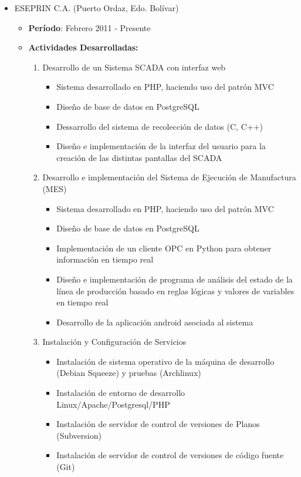 \documentclass[letterpaper,12pt]{report}
\begin{document}
    \begin{itemize}

        \item{ESEPRIN C.A. (Puerto Ordaz, Edo. Bolívar)}
        \begin{itemize}
        \item{\textbf{Período}: Febrero 2011 - Presente}
        \item{\textbf{Actividades Desarrolladas:}}
            \begin{enumerate}
            \item Desarrollo de un Sistema SCADA con interfaz web
                \begin{itemize}
                \item Sistema desarrollado en PHP, haciendo uso del patrón MVC
                \item Diseño de base de datos en PostgreSQL
                \item Dessarrollo del sistema de recolección de datos (C, C++)
                \item Diseño e implementación de la interfaz del usuario para la creación de las distintas pantallas del SCADA
                \end{itemize}
            \item Desarrollo e implementación del Sistema de Ejecución de Manufactura (MES)
                \begin{itemize}
                \item Sistema desarrollado en PHP, haciendo uso del patrón MVC
                \item Diseño de base de datos en PostgreSQL
                \item Implementación de un cliente OPC en Python para obtener información en tiempo real
                \item Diseño e implementación de programa de análisis del estado de la línea de producción basado en reglas lógicas y valores de variables en tiempo real
                \item Desarrollo de la aplicación android asociada al sistema
                \end{itemize}
            \item Instalación y Configuración de Servicios
                \begin{itemize}
                \item Instalación de sistema operativo de la máquina de desarrollo (Debian Squeeze) y pruebas (Archlinux)
                \item Instalación de entorno de desarrollo Linux/Apache/Postgresql/PHP
                \item Instalación de servidor de control de versiones de Planos (Subversion)
                \item Instalación de servidor de control de versiones de código fuente (Git)
                \end{itemize}
            \end{enumerate}
        \end{itemize}
    

\end{itemize}
\end{document}
